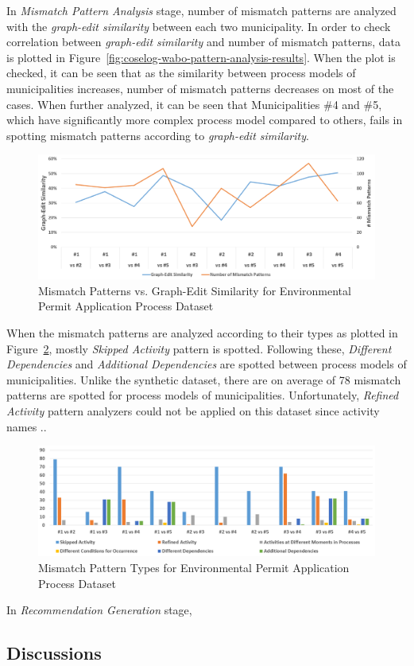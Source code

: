 In \textit{Mismatch Pattern Analysis} stage, number of mismatch patterns are analyzed with the \textit{graph-edit similarity} between each two municipality. In order to check correlation between \textit{graph-edit similarity} and number of mismatch patterns, data is plotted in Figure~\ref{fig:coselog-wabo-pattern-analysis-results}. When the plot is checked, it can be seen that as the similarity between process models of municipalities increases, number of mismatch patterns decreases on most of the cases. When further analyzed, it can be seen that Municipalities \#4 and \#5, which have significantly more complex process model compared to others, fails in spotting mismatch patterns according to \textit{graph-edit similarity}.
\begin{figure}
	\centering
	\includegraphics[width=\textwidth]{5_results_discussions/coselog-wabo/mismatch-pattern-analysis-results}
	\caption{Mismatch Patterns vs. Graph-Edit Similarity for Environmental Permit Application Process Dataset}
  \label{fig:coselog-wabo-mismatch-pattern-analysis-results}
\end{figure}
When the mismatch patterns are analyzed according to their types as plotted in Figure~\ref{fig:coselog-wabo-mismatch-pattern-types}, mostly \textit{Skipped Activity} pattern is spotted. Following these, \textit{Different Dependencies} and \textit{Additional Dependencies} are spotted between process models of municipalities. Unlike the synthetic dataset, there are on average of 78 mismatch patterns are spotted for process models of municipalities. Unfortunately, \textit{Refined Activity} pattern analyzers could not be applied on this dataset since activity names ..
\begin{figure}
	\centering
	\includegraphics[width=\textwidth]{5_results_discussions/coselog-wabo/mismatch-pattern-types}
	\caption{Mismatch Pattern Types for Environmental Permit Application Process Dataset}
  \label{fig:coselog-wabo-mismatch-pattern-types}
\end{figure} 


In \textit{Recommendation Generation} stage,

\subsection{Discussions}
\label{sec:coselog-discussions}